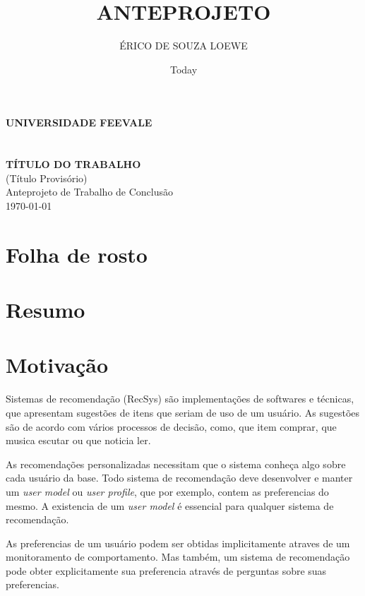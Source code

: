 \documentclass{article}
\title{ANTEPROJETO}
\author{ÉRICO DE SOUZA LOEWE}
\date{Today}
\begin{document}
\makeatletter
\begin{titlepage}
   \begin{center}
      \large\textbf{
      UNIVERSIDADE FEEVALE\\
      \@title\\
      \@author\\
      TÍTULO DO TRABALHO\\
      }
      (Título Provisório)\\
      Anteprojeto de Trabalho de Conclusão\\
      \today
   \end{center}
\end{titlepage}
\makeatother

\section{Folha de rosto}
\newpage

\section{Resumo}
\newpage

\section{Motivação}

Sistemas de recomendação (RecSys) são implementações de softwares e técnicas, que apresentam sugestões de itens que seriam de uso de um usuário. As sugestões são de acordo com vários processos de decisão, como, que item comprar, que musica escutar ou que noticia ler. \cite{ricci2011introduction}

As recomendações personalizadas necessitam que o sistema conheça algo sobre cada usuário da base.
Todo sistema de recomendação deve desenvolver e manter um \textit{user model} ou \textit{user profile}, que por exemplo, contem as preferencias do mesmo.
A existencia de um \textit{user model} é essencial para qualquer sistema de recomendação. \cite{jannach2010recommender}

As preferencias de um usuário podem ser obtidas implicitamente atraves de um monitoramento de comportamento. Mas também, um sistema de recomendação pode obter explicitamente sua preferencia através de perguntas sobre suas preferencias.
\cite{jannach2010recommender}
\end{document}
